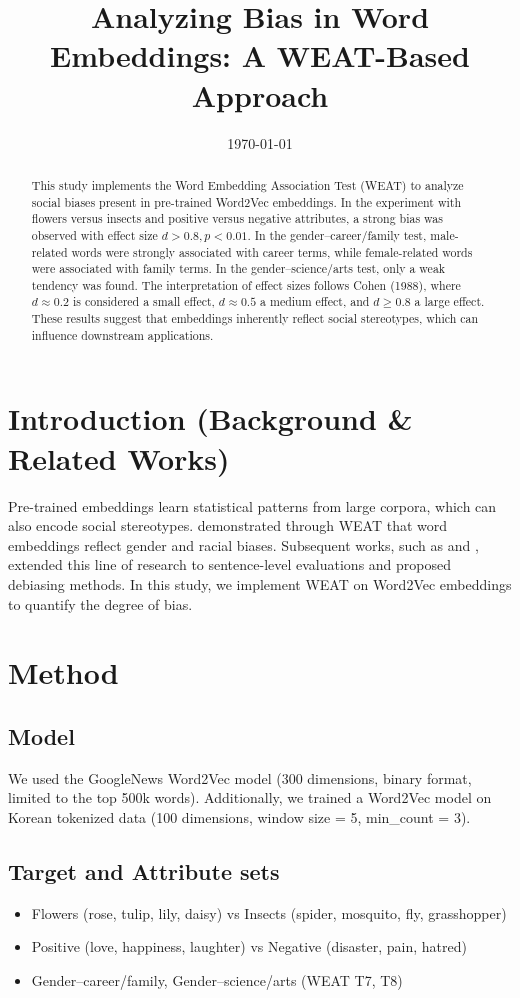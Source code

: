 \documentclass[12pt,a4paper]{article}
\title{Analyzing Bias in Word Embeddings: A WEAT-Based Approach}
\date{\today}
\begin{document}
\maketitle

\begin{abstract}
This study implements the Word Embedding Association Test (WEAT) to analyze 
social biases present in pre-trained Word2Vec embeddings. 
In the experiment with flowers versus insects and positive versus negative attributes, 
a strong bias was observed with effect size $d > 0.8, p < 0.01$. 
In the gender--career/family test, male-related words were strongly associated with career terms, 
while female-related words were associated with family terms. 
In the gender--science/arts test, only a weak tendency was found. 
The interpretation of effect sizes follows Cohen (1988), where 
$d \approx 0.2$ is considered a small effect, 
$d \approx 0.5$ a medium effect, 
and $d \geq 0.8$ a large effect. 
These results suggest that embeddings inherently reflect social stereotypes, 
which can influence downstream applications.
\end{abstract}

\section{Introduction (Background \& Related Works)}
Pre-trained embeddings learn statistical patterns from large corpora, 
which can also encode social stereotypes. 
\citet{caliskan2017} demonstrated through WEAT that word embeddings reflect gender and racial biases. 
Subsequent works, such as \citet{bolukbasi2016} and \citet{may2019}, 
extended this line of research to sentence-level evaluations and proposed debiasing methods. 
In this study, we implement WEAT on Word2Vec embeddings to quantify the degree of bias.

\section{Method}
\subsection{Model}
We used the GoogleNews Word2Vec model (300 dimensions, binary format, limited to the top 500k words). 
Additionally, we trained a Word2Vec model on Korean tokenized data 
(100 dimensions, window size = 5, min\_count = 3).

\subsection{Target and Attribute sets}
\begin{itemize}
  \item Flowers (rose, tulip, lily, daisy) vs Insects (spider, mosquito, fly, grasshopper)
  \item Positive (love, happiness, laughter) vs Negative (disaster, pain, hatred)
  \item Gender--career/family, Gender--science/arts (WEAT T7, T8)
\end{itemize}
\end{document}
